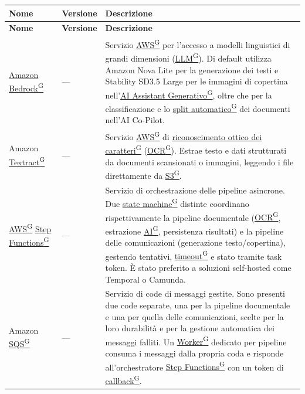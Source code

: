 \documentclass[a4paper,12pt]{article}
\providecommand{\glslink}[2]{\href{https://alittlebyte-19.github.io/Documentazione/glossario.html\#gls-#1}{\underline{#2}\textsuperscript{\scriptsize G}}}
\begin{document}
\renewcommand{\arraystretch}{1.3}
{\small
\setlength{\LTleft}{0pt}
\setlength{\LTright}{0pt}
\begin{longtable}{|p{3.5cm}|p{1.8cm}|p{9.2cm}|}
    \hline
    \rowcolor{gray!20}
    \textbf{Nome} & \textbf{Versione} & \textbf{Descrizione} \\
    \hline
    \endfirsthead
    \hline
    \rowcolor{gray!20}
    \textbf{Nome} & \textbf{Versione} & \textbf{Descrizione} \\
    \hline
    \endhead
    \glslink{amazon-bedrock}{Amazon Bedrock} & --- & Servizio \glslink{aws}{AWS} per l'accesso a modelli linguistici di grandi dimensioni (\glslink{llm-large-language-model}{LLM}). Di default utilizza Amazon Nova Lite per la generazione dei testi e Stability SD3.5 Large per le immagini di copertina nell'\glslink{ai-assistant-generativo}{AI Assistant Generativo}, oltre che per la classificazione e lo \glslink{split-automatico}{split automatico} dei documenti nell'AI Co-Pilot. \\
    \hline
    Amazon \glslink{textract}{Textract} & --- & Servizio \glslink{aws}{AWS} di \glslink{ocr-riconoscimento-ottico-dei-caratteri}{riconoscimento ottico dei caratteri} (\glslink{ocr-riconoscimento-ottico-dei-caratteri}{OCR}). Estrae testo e dati strutturati da documenti scansionati o immagini, leggendo i file direttamente da \glslink{s3-simple-storage-service}{S3}. \\
    \hline
    \glslink{aws}{AWS} \glslink{step-functions}{Step Functions} & --- & Servizio di orchestrazione delle pipeline asincrone. Due \glslink{state-machine}{state machine} distinte coordinano rispettivamente la pipeline documentale (\glslink{ocr-riconoscimento-ottico-dei-caratteri}{OCR}, estrazione \glslink{intelligenza-artificiale-ai}{AI}, persistenza risultati) e la pipeline delle comunicazioni (generazione testo/copertina), gestendo tentativi, \glslink{timeout}{timeout} e stato tramite task token. È stato preferito a soluzioni self-hosted come Temporal o Camunda. \\
    \hline
    Amazon \glslink{sqs-simple-queue-service}{SQS} & --- & Servizio di code di messaggi gestite. Sono presenti due code separate, una per la pipeline documentale e una per quella delle comunicazioni, scelte per la loro durabilità e per la gestione automatica dei messaggi falliti. Un \glslink{worker}{Worker} dedicato per pipeline consuma i messaggi dalla propria coda e risponde all'orchestratore \glslink{step-functions}{Step Functions} con un token di \glslink{callback}{callback}. \\

\end{longtable}}
\end{document}
